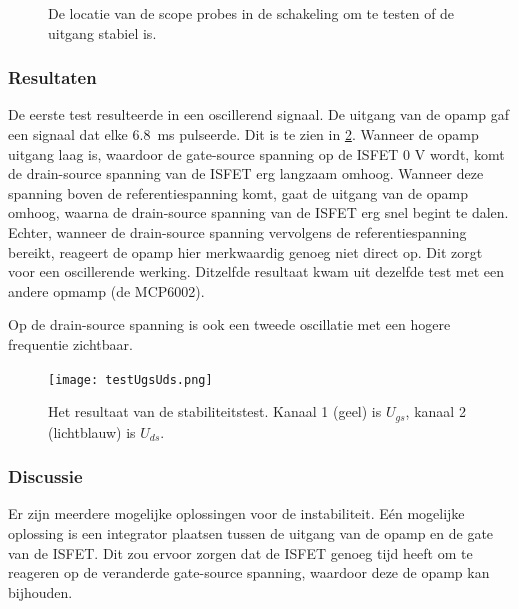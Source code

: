 \begin{figure}[ht]
    \centering
    \def\svgwidth{0.75\textwidth}
    
    \caption{De locatie van de scope probes in de schakeling om te testen of de uitgang stabiel is.}
    \label{fig:test ISFET circuit best}
\end{figure}


\subsubsection{Resultaten} \label{sec:stabilityTestResults}

De eerste test resulteerde in een oscillerend signaal. De uitgang van de opamp gaf een signaal dat elke \qty{6.8}{\milli\second} pulseerde. Dit is te zien in \cref{fig:resultUgsUds}.
Wanneer de opamp uitgang laag is, waardoor de gate-source spanning op de ISFET 0 V wordt, komt de drain-source spanning van de ISFET erg langzaam omhoog. Wanneer deze spanning boven de referentiespanning komt, gaat de uitgang van de opamp omhoog, waarna de drain-source spanning van de ISFET erg snel begint te dalen. Echter, wanneer de drain-source spanning vervolgens de referentiespanning bereikt, reageert de opamp hier merkwaardig genoeg niet direct op. Dit zorgt voor een oscillerende werking. Ditzelfde resultaat kwam uit dezelfde test met een andere opmamp (de MCP6002).

Op de drain-source spanning is ook een tweede oscillatie met een hogere frequentie zichtbaar.



% 


\begin{figure}[ht]
    \centering
    \def\svgwidth{0.75\textwidth}
    \texttt{[image: testUgsUds.png]}
    \caption{Het resultaat van de stabiliteitstest. Kanaal 1 (geel) is $U_{gs}$, kanaal 2 (lichtblauw) is $U_{ds}$.}
    \label{fig:resultUgsUds}
\end{figure}


\subsubsection{Discussie}
Er zijn meerdere mogelijke oplossingen voor de instabiliteit.
Eén mogelijke oplossing is een integrator plaatsen tussen de uitgang van de opamp en de gate van de ISFET. Dit zou ervoor zorgen dat de ISFET genoeg tijd heeft om te reageren op de veranderde gate-source spanning, waardoor deze de opamp kan bijhouden.

